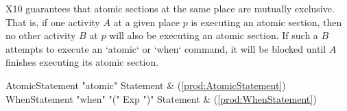 X10 guarantees that atomic sections at the same place are mutually exclusive.
That is, if one activity $A$ at a given place $p$ is executing an atomic
section, then no other activity $B$ at $p$ will also be executing an atomic
section. If such a $B$ attempts to execute an \xcd`atomic` or \xcd`when`
command, it will be blocked until $A$ finishes executing its atomic section.  



\begin{bbgrammar}
     AtomicStatement \: \xcd"atomic" Statement & (\ref{prod:AtomicStatement}) \\
       WhenStatement \: \xcd"when" \xcd"(" Exp \xcd")" Statement & (\ref{prod:WhenStatement}) \\
\end{bbgrammar}

